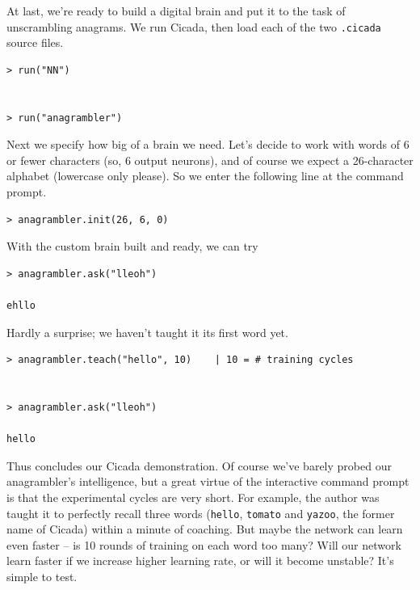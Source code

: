 \documentclass{article}
\newenvironment{code}{
       \begin{list}{}{
               \setlength{\leftmargin}{.4in}
               \setlength{\rightmargin}{0in}
               \setlength{\topsep}{.2in}
       }
       \small
       \item[] }
       { \end{list}   }
\begin{document}
At last, we're ready to build a digital brain and put it to the task of unscrambling anagrams.  We run Cicada, then load each of the two \verb#.cicada# source files.

\begin{code} \begin{verbatim}
> run("NN")


> run("anagrambler")
\end{verbatim} \end{code}

Next we specify how big of a brain we need.  Let's decide to work with words of 6 or fewer characters (so, 6 output neurons), and of course we expect a 26-character alphabet (lowercase only please).  So we enter the following line at the command prompt.

\begin{code} \begin{verbatim}
> anagrambler.init(26, 6, 0)
\end{verbatim} \end{code}

With the custom brain built and ready, we can try

\begin{code} \begin{verbatim}
> anagrambler.ask("lleoh")

ehllo
\end{verbatim} \end{code}

\noindent Hardly a surprise; we haven't taught it its first word yet.

\begin{code} \begin{verbatim}
> anagrambler.teach("hello", 10)    | 10 = # training cycles


> anagrambler.ask("lleoh")

hello
\end{verbatim} \end{code}

Thus concludes our Cicada demonstration.  Of course we've barely probed our anagrambler's intelligence, but a great virtue of the interactive command prompt is that the experimental cycles are very short.  For example, the author was taught it to perfectly recall three words (\verb#hello#, \verb#tomato# and \verb#yazoo#, the former name of Cicada) within a minute of coaching.  But maybe the network can learn even faster -- is 10 rounds of training on each word too many?  Will our network learn faster if we increase higher learning rate, or will it become unstable?  It's simple to test.
\end{document}
